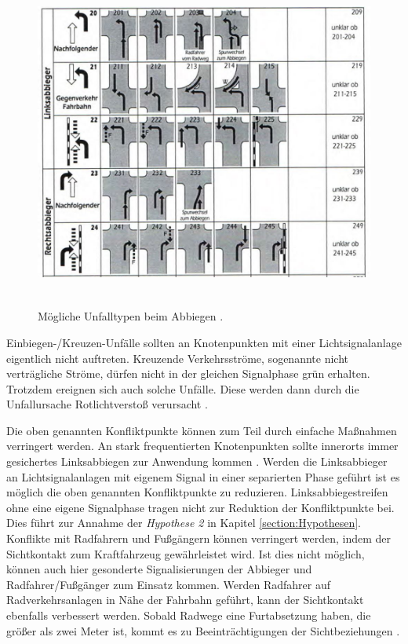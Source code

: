 \begin{savenotes}
	\begin{figure}[H]
		\centering
		\includegraphics[width=13cm,height=11cm]{figures/Abbiege-Unfall}
		\caption[Unfalltyp 2 Abbiege-Unfall]{Mögliche Unfalltypen beim Abbiegen \parencite[S. 11]{GesamtverbandderDeutschenVersicherungswirtschafte.V..2016}. }\label{fig:Abbiege-Unfall}
	\end{figure}
\end{savenotes}

Einbiegen-/Kreuzen-Unfälle sollten an Knotenpunkten mit einer Lichtsignalanlage eigentlich nicht auftreten. Kreuzende Verkehrsströme, sogenannte nicht verträgliche Ströme, dürfen nicht in der gleichen Signalphase grün erhalten. Trotzdem ereignen sich auch solche Unfälle. Diese werden dann durch die Unfallursache Rotlichtverstoß verursacht \parencite[S. 274]{Schreiber.2016}. 

Die oben genannten Konfliktpunkte können zum Teil durch einfache Maßnahmen verringert werden. An stark frequentierten Knotenpunkten sollte innerorts immer gesichertes Linksabbiegen zur Anwendung kommen \parencite[S. 275]{Schreiber.2016}. Werden die Linksabbieger an Lichtsignalanlagen mit eigenem Signal in einer separierten Phase geführt ist es möglich die oben genannten Konfliktpunkte zu reduzieren. Linksabbiegestreifen ohne eine eigene Signalphase tragen nicht zur Reduktion der Konfliktpunkte bei. Dies führt zur Annahme der \textit{Hypothese 2} in Kapitel \ref{section:Hypothesen}. Konflikte mit Radfahrern und Fußgängern können verringert werden, indem der Sichtkontakt zum Kraftfahrzeug gewährleistet wird. Ist dies nicht möglich, können auch hier gesonderte Signalisierungen der Abbieger und Radfahrer/Fußgänger zum Einsatz kommen. Werden Radfahrer auf Radverkehrsanlagen in Nähe der Fahrbahn geführt, kann der Sichtkontakt ebenfalls verbessert werden. Sobald Radwege eine Furtabsetzung haben, die größer als zwei Meter ist, kommt es zu Beeinträchtigungen der Sichtbeziehungen \parencite[S. 276f]{Schreiber.2016}.


